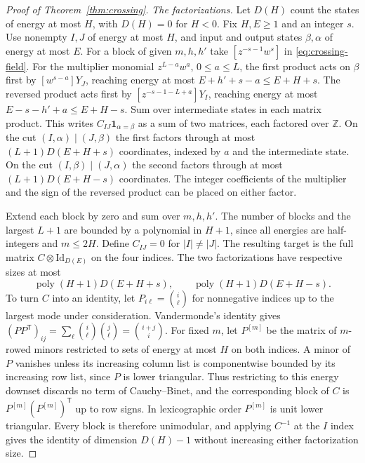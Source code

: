 \begin{proof}[Proof of Theorem~\ref{thm:crossing}]
\smallskip\noindent\emph{The factorizations.}
Let $D(H)$ count the states of energy at most $H$, with $D(H)=0$ for
$H<0$. Fix $H,E\ge1$ and an integer $s$. Use nonempty $I,J$ of
energy at most $H$, and input and output states $\beta,\alpha$ of
energy at most $E$. For a block of given $m,h,h'$ take
$[z^{-s-1}w^s]$ in \eqref{eq:crossing-field}. For the multiplier
monomial $z^{L-a}w^a$, $0\le a\le L$, the first product acts on
$\beta$ first by $[w^{s-a}]Y_J$, reaching energy at most
$E+h'+s-a\le E+H+s$. The reversed product acts first by
$[z^{-s-1-L+a}]Y_I$, reaching energy at most
$E-s-h'+a\le E+H-s$. Sum over intermediate states in each matrix
product. This writes $C_{IJ}\mathbf 1_{\alpha=\beta}$ as a sum of
two matrices, each factored over $\mathbb Z$. On the cut
$(I,\alpha)\mid(J,\beta)$ the first factors through at most
$(L+1)D(E+H+s)$ coordinates, indexed by $a$ and the intermediate
state. On the cut $(I,\beta)\mid(J,\alpha)$ the second factors
through at most $(L+1)D(E+H-s)$ coordinates. The integer coefficients
of the multiplier and the sign of the reversed product can be placed
on either factor.

Extend each block by zero and sum over $m,h,h'$. The number of blocks
and the largest $L+1$ are bounded by a polynomial in $H+1$, since
all energies are half-integers and $m\le 2H$. Define $C_{IJ}=0$ for
$|I|\ne |J|$. The resulting target is the full matrix
$C\otimes\mathrm{Id}_{D(E)}$ on the four indices. The two factorizations
have respective sizes at most
\[
  \operatorname{poly}(H+1)D(E+H+s),\qquad
  \operatorname{poly}(H+1)D(E+H-s).
\]
To turn $C$ into an identity, let $P_{i\ell}=\binom{i}{\ell}$
for nonnegative indices up to the largest mode under consideration.
Vandermonde's identity gives
$(PP^{\mathsf T})_{ij}=\sum_\ell\binom{i}{\ell}\binom{j}{\ell}
=\binom{i+j}{i}$. For fixed $m$, let $P^{[m]}$ be the matrix of
$m$-rowed minors restricted to sets of energy at most $H$ on both
indices. A minor of $P$ vanishes unless its increasing column list
is componentwise bounded by its increasing row list, since $P$ is
lower triangular. Thus restricting to this energy downset discards
no term of Cauchy--Binet, and the corresponding block of $C$ is
$P^{[m]}(P^{[m]})^{\mathsf T}$ up to row signs. In lexicographic
order $P^{[m]}$ is unit lower triangular. Every block is therefore
unimodular, and applying $C^{-1}$ at the $I$ index gives the
identity of dimension $D(H)-1$ without increasing either factorization
size.


\end{proof}
